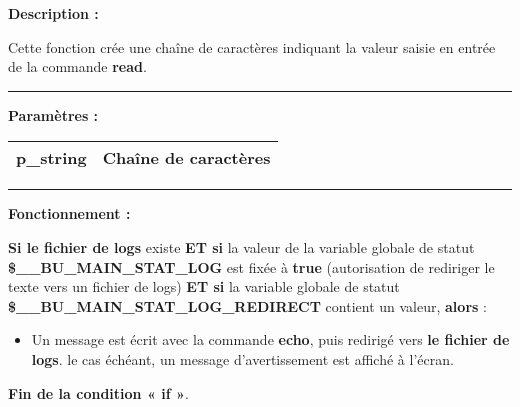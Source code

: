 \documentclass[a4paper,10pt]{article}
\begin{document}
\begin{justify}
    \textbf{Description :}

    Cette fonction crée une chaîne de caractères indiquant la valeur saisie en entrée de la commande \textbf{\color{cmds}read}.
\end{justify}


\par\noindent\rule{\textwidth}{0.4pt}

\begin{justify}
    \textbf{Paramètres :}

    \begin{tabular}{|l|l|}
        \hline
        \textbf{\color{vars}p\_string} & Chaîne de caractères\\
        \hline
    \end{tabular}
\end{justify}


\par\noindent\rule{\textwidth}{0.4pt}

\begin{justify}
    \textbf{Fonctionnement :}

    \textbf{\color{cond}Si \color{path}le fichier de logs} existe \textbf{\color{cond}ET si} la valeur de la variable globale de statut \textbf{\color{vars}\$\_\_BU\_MAIN\_STAT\_LOG} est fixée à \textbf{true} (autorisation de rediriger le texte vers un fichier de logs) \textbf{\color{cond}ET si} la variable globale de statut \textbf{\color{vars}\$\_\_BU\_MAIN\_STAT\_LOG\_REDIRECT} contient un valeur, \textbf{\color{cond}alors} :

    \begin{itemize}
        \item
        {
            \begin{justify}
                Un message est écrit avec la commande \textbf{\color{cmds}echo}, puis redirigé vers \textbf{\color{path}le fichier de logs}. le cas échéant, un message d'avertissement est affiché à l'écran.
            \end{justify}
        }
    \end{itemize}
\end{justify}

\begin{justify}
    \textbf{\color{cond}Fin de la condition « if »}.
\end{justify}
\end{document}
